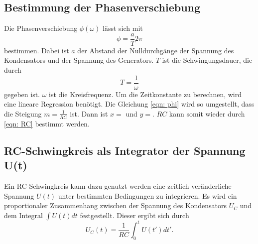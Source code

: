 \subsection{Bestimmung der Phasenverschiebung} %
Die Phasenverschiebung $\phi(\omega)$ lässt sich mit
\begin{equation}
    \phi = \frac{a}{T}2\pi
\end{equation}
bestimmen. Dabei ist $a$ der Abstand der Nulldurchgänge der Spannung des Kondensators und der Spannung des Generators.
$T$ ist die Schwingungsdauer, die durch
\begin{equation}
    T = \frac{1}{\omega}
\end{equation}
gegeben ist. $\omega$ ist die Kreisfrequenz.
Um die Zeitkonstante zu berechnen, wird eine lineare Regression benötigt.
Die Gleichung \eqref{eqn: phi} wird so umgestellt, dass die Steigung $m = \frac{1}{RC}$ ist.
Dann ist $x= $ und $y= $. %
$RC$ kann somit wieder durch \eqref{eqn: RC} bestimmt werden.

\subsection{RC-Schwingkreis als Integrator der Spannung U(t)}
Ein RC-Schwingkreis kann dazu genutzt werden eine zeitlich veränderliche Spannung $U(t)$ unter bestimmten Bedingungen zu integrieren. 
Es wird ein proportionaler Zusammenhang zwischen der Spannung des Kondensators $U_{C}$ und dem Integral $\int U(t) dt$ festgestellt. Dieser ergibt sich durch 
\begin{equation}
    U_{C}(t) = \frac{1}{RC} \int_{0}^{t} U(t') dt'.
\end{equation}



